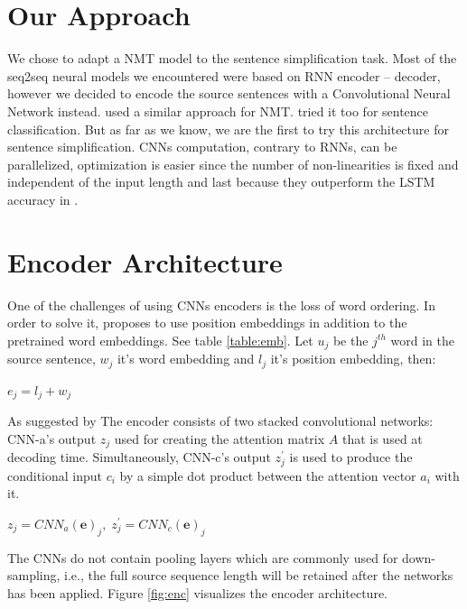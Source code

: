 \documentclass{article}
\begin{document}
\section{Our Approach}
We chose to adapt a NMT model to the sentence simplification task. Most of the seq2seq neural models we encountered were based on RNN encoder – decoder, however we decided to encode the source sentences with a Convolutional Neural Network instead.
\cite{DBLP:journals/corr/GehringAGD16} used a similar approach for NMT. \cite{di2019enriching} tried it too for sentence classification. But as far as we know, we are the first to try this architecture for sentence simplification.
CNNs computation, contrary to RNNs, can be parallelized, optimization is easier since the number of non-linearities is fixed and independent of the input length and last because they outperform the LSTM accuracy in \cite{DBLP:journals/corr/WuSCLNMKCGMKSJL16}.

\section{Encoder Architecture}
One of the challenges of using CNNs encoders is the loss of word ordering. In order to solve it, \cite{DBLP:journals/corr/GehringAGD16} proposes to use position embeddings in addition to the pretrained word embeddings. See table \ref{table:emb}. Let $u_j$ be the $j^{th}$ word in the source sentence, $w_j$ it's word embedding and $l_j$ it's position embedding, then:
\begin{center}
$e_j = l_j + w_j$
\end{center}
As suggested by \cite{DBLP:journals/corr/GehringAGD16} The encoder consists of two stacked convolutional networks: CNN-a’s output $z_{j}$ used for creating the attention matrix $A$ that is used at decoding time. Simultaneously, CNN-c’s output $z^{\prime}_{j}$ is used to produce the conditional input $c_i$ by a simple dot product between the attention vector $a_i$ with it.
\vspace{5mm}
\begin{center}
$z_j = CNN_a(\textbf{e})_j,\;z^{\prime}_{j} = CNN_c(\textbf{e})_j$
\vspace{5mm}
\end{center}

The CNNs do not contain pooling layers which are commonly used for down-sampling, i.e., the full source sequence length will be retained after the networks has been applied. Figure \ref{fig:enc} visualizes the encoder architecture.
\end{document}
